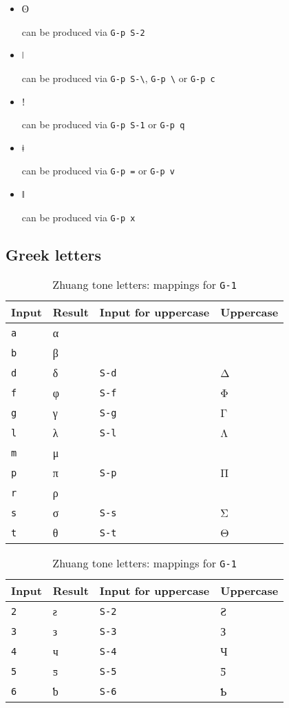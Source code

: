 \documentclass[oneside]{memoir}
\newcommand{\key}{\verb}
\newcommand{\keynv}{\texttt}
\newcommand{\out}[1]{\colorbox{gray!20}{\strut{}#1}}
\begin{document}
\begin{itemize}[noitemsep]
\item \out{ʘ} can be produced via \key|G-p S-2|
\item \out{ǀ} can be produced via \key|G-p S-\|, \key|G-p \| or \key|G-p c|
\item \out{ǃ} can be produced via \key|G-p S-1| or \key|G-p q|
\item \out{ǂ} can be produced via \key|G-p =| or \key|G-p v|
\item \out{ǁ} can be produced via \key|G-p x|
\end{itemize}

\subsection{Greek letters}
\label{sec:greek_letters}

\begin{table}[b]
\centerfloat
\begin{minipage}[b]{0.42\paperwidth}
\caption{Greek letters: mappings for \keynv{G-j}}
\label{tab:greek_letters}
\centering
\begin{tabular}{llll}
\toprule
Input & Result & Input for uppercase & Uppercase \\
\midrule
\key|a| & α & & \\
\key|b| & β & & \\
\key|d| & δ & \key|S-d| & Δ \\
\key|f| & φ & \key|S-f| & Φ \\
\key|g| & γ & \key|S-g| & Γ \\
\key|l| & λ & \key|S-l| & Λ \\
\key|m| & μ & & \\
\key|p| & π & \key|S-p| & Π \\
\key|r| & ρ & & \\
\key|s| & σ & \key|S-s| & Σ \\
\key|t| & θ & \key|S-t| & Θ \\
\bottomrule
\end{tabular}
\end{minipage}\hfill
\begin{minipage}[b]{0.42\paperwidth}
\caption{Zhuang tone letters: mappings for \keynv{G-1}}
\label{tab:zhuang_tones}
\centering
\begin{tabular}{llll}
\toprule
Input & Result & Input for uppercase & Uppercase \\
\midrule
\key|2| & ƨ & \key|S-2| & Ƨ \\
\key|3| & з & \key|S-3| & З \\
\key|4| & ч & \key|S-4| & Ч \\
\key|5| & ƽ & \key|S-5| & Ƽ \\
\key|6| & ƅ & \key|S-6| & Ƅ \\
\bottomrule
\end{tabular}
\end{minipage}
\end{table}
\end{document}
